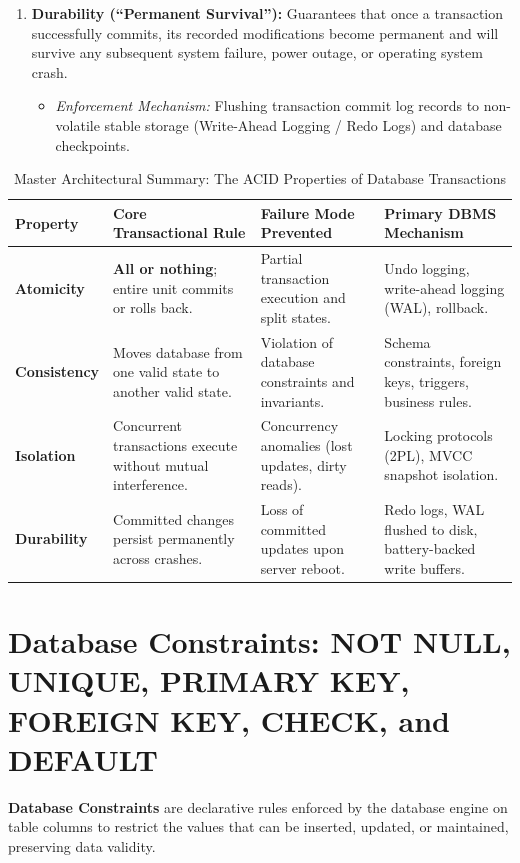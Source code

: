 \begin{enumerate}
\item \textbf{Durability (``Permanent Survival''):}
Guarantees that once a transaction successfully commits, its recorded modifications become permanent and will survive any subsequent system failure, power outage, or operating system crash.
\begin{itemize}
\item \textit{Enforcement Mechanism:} Flushing transaction commit log records to non-volatile stable storage (Write-Ahead Logging / Redo Logs) and database checkpoints.
\end{itemize}
\end{enumerate}

\begin{table}[htbp]
\centering
\caption{Master Architectural Summary: The ACID Properties of Database Transactions}
\label{tab:acid_properties_master}
\begin{tabularx}{\textwidth}{l p{4.2cm} X X}
\toprule
\textbf{Property} & \textbf{Core Transactional Rule} & \textbf{Failure Mode Prevented} & \textbf{Primary DBMS Mechanism} \\
\midrule
\textbf{Atomicity} & \textbf{All or nothing}; entire unit commits or rolls back. & Partial transaction execution and split states. & Undo logging, write-ahead logging (WAL), rollback. \\
\textbf{Consistency} & Moves database from one valid state to another valid state. & Violation of database constraints and invariants. & Schema constraints, foreign keys, triggers, business rules. \\
\textbf{Isolation} & Concurrent transactions execute without mutual interference. & Concurrency anomalies (lost updates, dirty reads). & Locking protocols (2PL), MVCC snapshot isolation. \\
\textbf{Durability} & Committed changes persist permanently across crashes. & Loss of committed updates upon server reboot. & Redo logs, WAL flushed to disk, battery-backed write buffers. \\
\bottomrule
\end{tabularx}
\end{table}

\newpage
\section{Database Constraints: NOT NULL, UNIQUE, PRIMARY KEY, FOREIGN KEY, CHECK, and DEFAULT}

\textbf{Database Constraints} are declarative rules enforced by the database engine on table columns to restrict the values that can be inserted, updated, or maintained, preserving data validity.

